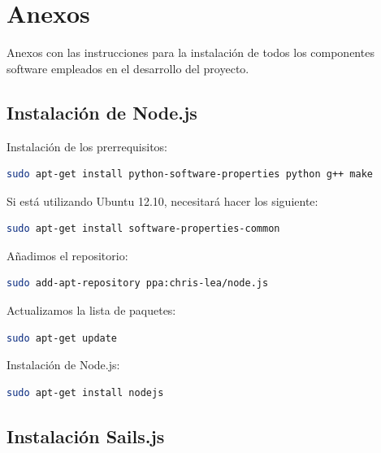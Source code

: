 

\chapter{Anexos}
\label{chap:anexos}

Anexos con las instrucciones para la instalación de todos los componentes software empleados en el desarrollo del proyecto.

\section{Instalación de Node.js}


Instalación de los prerrequisitos:

\begin{lstlisting}[language=bash]
sudo apt-get install python-software-properties python g++ make
\end{lstlisting}


Si está utilizando Ubuntu 12.10, necesitará hacer los siguiente:

\begin{lstlisting}[language=bash]
sudo apt-get install software-properties-common
\end{lstlisting}


Añadimos el repositorio:

\begin{lstlisting}[language=bash]
sudo add-apt-repository ppa:chris-lea/node.js
\end{lstlisting}

Actualizamos la lista de paquetes:

\begin{lstlisting}[language=bash]
sudo apt-get update
\end{lstlisting}

Instalación de  Node.js:

\begin{lstlisting}[language=bash]
sudo apt-get install nodejs
\end{lstlisting}




\section{Instalación Sails.js}

